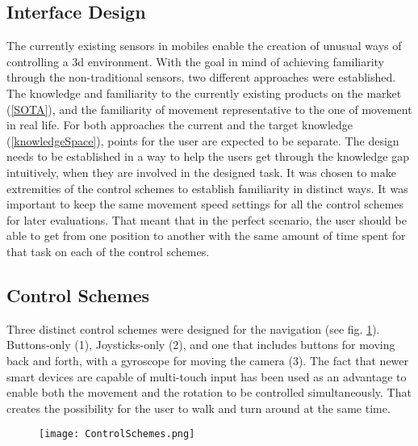\subsection{Interface Design}
The currently existing sensors in mobiles enable the creation of unusual ways of controlling a 3d environment. With the goal in mind of achieving familiarity through the non-traditional sensors, two different approaches were established. The knowledge and familiarity to the currently existing products on the market (\ref{SOTA}), and the familiarity of movement representative to the one of movement in real life. For both approaches the current and the target knowledge (\ref{knowledgeSpace}), points for the user are expected to be separate. The design needs to be established in a way to help the users get through the knowledge gap intuitively, when they are involved in the designed task. It was chosen to make extremities of the control schemes to establish familiarity in distinct ways. It was important to keep the same movement speed settings for all the control schemes for later evaluations. That meant that in the perfect scenario, the user should be able to get from one position to another with the same amount of time spent for that task on each of the control schemes.

\subsection{Control Schemes}
Three distinct control schemes were designed for the navigation (see fig. \ref{fig:ControlSchemes}). Buttons-only (1), Joysticks-only (2), and one that includes buttons for moving back and forth, with a gyroscope for moving the camera (3). The fact that newer smart devices are capable of multi-touch input has been used as an advantage to enable both the movement and the rotation to be controlled simultaneously. That creates the possibility for the user to walk and turn around at the same time.

\begin{figure}[H]
\label{fig:ControlSchemes}
\centering
  \texttt{[image: ControlSchemes.png]}
\end{figure}

